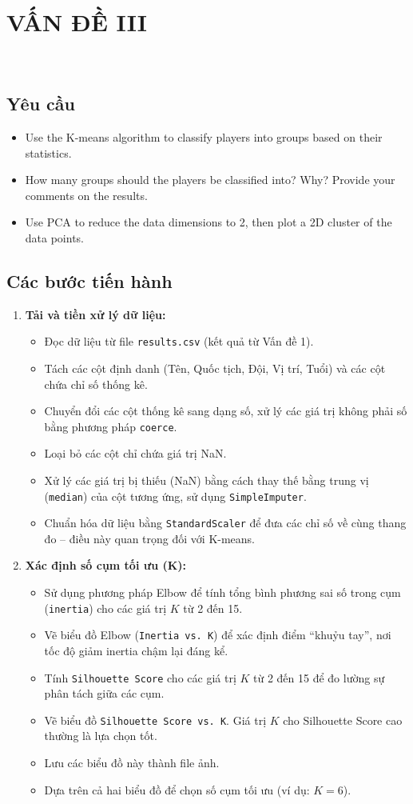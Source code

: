 \documentclass[12pt]{report}
\begin{document}
\chapter{VẤN ĐỀ III}\
{
\section{Yêu cầu}
\begin{itemize}
	\item Use the K-means algorithm to classify players into groups based on their statistics.
	\item How many groups should the players be classified into? Why? Provide your comments on the results.
	\item Use PCA to reduce the data dimensions to 2, then plot a 2D cluster of the data points.
\end{itemize}
\section{Các bước tiến hành}
\begin{enumerate}
	\item \textbf{Tải và tiền xử lý dữ liệu:}
\begin{itemize}
  \item Đọc dữ liệu từ file \texttt{results.csv} (kết quả từ Vấn đề 1).
  \item Tách các cột định danh (Tên, Quốc tịch, Đội, Vị trí, Tuổi) và các cột chứa chỉ số thống kê.
  \item Chuyển đổi các cột thống kê sang dạng số, xử lý các giá trị không phải số bằng phương pháp \texttt{coerce}.
  \item Loại bỏ các cột chỉ chứa giá trị NaN.
  \item Xử lý các giá trị bị thiếu (NaN) bằng cách thay thế bằng trung vị (\texttt{median}) của cột tương ứng, sử dụng \texttt{SimpleImputer}.
  \item Chuẩn hóa dữ liệu bằng \texttt{StandardScaler} để đưa các chỉ số về cùng thang đo -- điều này quan trọng đối với K-means.
\end{itemize}

	\item \textbf{Xác định số cụm tối ưu (K):}
\begin{itemize}
  \item Sử dụng phương pháp Elbow để tính tổng bình phương sai số trong cụm (\texttt{inertia}) cho các giá trị $K$ từ 2 đến 15.
  \item Vẽ biểu đồ Elbow (\texttt{Inertia vs. K}) để xác định điểm ``khuỷu tay'', nơi tốc độ giảm inertia chậm lại đáng kể.
  \item Tính \texttt{Silhouette Score} cho các giá trị $K$ từ 2 đến 15 để đo lường sự phân tách giữa các cụm.
  \item Vẽ biểu đồ \texttt{Silhouette Score vs. K}. Giá trị $K$ cho Silhouette Score cao thường là lựa chọn tốt.
  \item Lưu các biểu đồ này thành file ảnh.
  \item Dựa trên cả hai biểu đồ để chọn số cụm tối ưu (ví dụ: $K=6$).
\end{itemize}


\end{enumerate}}
\end{document}
